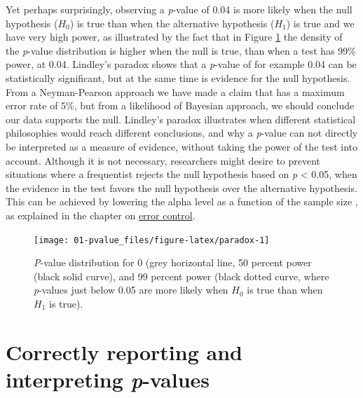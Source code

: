 \documentclass[
  oneside]{book}
\begin{document}
Yet perhaps surprisingly, observing a \emph{p}-value of 0.04 is more likely when the null hypothesis (\(H_0\)) is true than when the alternative hypothesis (\(H_1\)) is true and we have very high power, as illustrated by the fact that in Figure \ref{fig:paradox} the density of the \emph{p}-value distribution is higher when the null is true, than when a test has 99\% power, at 0.04. Lindley's paradox shows that a \emph{p}-value of for example 0.04 can be statistically significant, but at the same time is evidence for the null hypothesis. From a Neyman-Pearson approach we have made a claim that has a maximum error rate of 5\%, but from a likelihood of Bayesian approach, we should conclude our data supports the null. Lindley's paradox illustrates when different statistical philosophies would reach different conclusions, and why a \emph{p}-value can not directly be interpreted as a measure of evidence, without taking the power of the test into account. Although it is not necessary, researchers might desire to prevent situations where a frequentist rejects the null hypothesis based on \emph{p} \textless{} 0.05, when the evidence in the test favors the null hypothesis over the alternative hypothesis. This can be achieved by lowering the alpha level as a function of the sample size \citep{leamer_specification_1978, maier_justify_2022, good_bayesnon-bayes_1992}, as explained in the chapter on \protect\hyperlink{errorcontrol}{error control}.



\begin{figure}

{\centering \texttt{[image: 01-pvalue\_files/figure-latex/paradox-1]} 

}

\caption{\emph{P}-value distribution for 0 (grey horizontal line, 50 percent power (black solid curve), and 99 percent power (black dotted curve, where \emph{p}-values just below 0.05 are more likely when \(H_0\) is true than when \(H_1\) is true).}\label{fig:paradox}
\end{figure}

\hypertarget{correctly-reporting-and-interpreting-p-values}{%
\section{\texorpdfstring{Correctly reporting and interpreting \emph{p}-values}{Correctly reporting and interpreting p-values}}\label{correctly-reporting-and-interpreting-p-values}}
\end{document}
